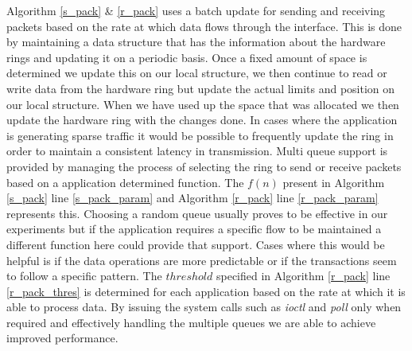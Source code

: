 \documentclass[conference]{IEEEtran}
\begin{document}
Algorithm \ref{s_pack} \& \ref{r_pack} uses a batch update for sending and receiving packets based on the rate at which data flows through the interface. This is done by maintaining a data structure that has the information about the hardware rings and updating it on a periodic basis. Once a fixed amount of space is determined we update this on our local structure, we then continue to read or write data from the hardware ring but update the actual limits and position on our local structure. When we have used up the space that was allocated we then update the hardware ring with the changes done. In cases where the application is generating sparse traffic it would be possible to frequently update the ring in order to maintain a consistent latency in transmission. Multi queue support is provided by managing the process of selecting the ring to send or receive packets based on a application determined function. The $f(n)$ present in Algorithm \ref{s_pack} line \ref{s_pack_param} and Algorithm \ref{r_pack} line \ref{r_pack_param} represents this. Choosing a random queue usually proves to be effective in our experiments but if the application requires a specific flow to be maintained a different function here could provide that support. Cases where this would be helpful is if the data operations are more predictable or if the transactions seem to follow a specific pattern. The $threshold$ specified in Algorithm \ref{r_pack} line \ref{r_pack_thres} is determined for each application based on the rate at which it is able to process data. By issuing the system calls such as \textit{ioctl} and \textit{poll} only when required and effectively handling the multiple queues we are able to achieve improved performance.
\end{document}
